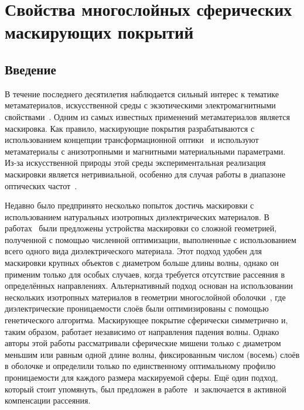 \chapter{ Свойства многослойных сферических маскирующих
  покрытий} \label{chapt3}
\section{Введение}
В течение последнего десятилетия наблюдается сильный интерес к
тематике метаматериалов, искусственной среды с экзотическими
электромагнитными свойствами~\cite{Smith-2004,
  Schurig-2006, Shalaev-2007, Kivshar-2012}. Одним из самых известных
применений метаматериалов является маскировка. Как правило,
маскирующие покрытия разрабатываются с использованием концепции
трансформационной оптики~\cite{pendry_TO, Leonhardt-2006} и
используют метаматериалы с анизотропными и магнитными
материальными параметрами. Из-за искусственной природы этой среды
экспериментальная реализация маскировки является нетривиальной,
особенно для случая работы в диапазоне оптических
частот~\cite{Kildishev:2011, alu, XU-Su:120408, Alu-2005}. 

Недавно было предпринято несколько попыток достичь маскировки с
использованием натуральных изотропных диэлектрических материалов. В
работах~\cite{Sigmund-AllDiel-2011, smith-3dprinterCloak-2013,
  Fujii_topolOpti_theory_2013,
  ma-experiment-topology-2013,LayeredShell,MOP:MOP27024} были
предложены устройства маскировки со сложной геометрией, полученной
с помощью численной оптимизации, выполненные с использованием всего
одного вида диэлектрического материала.  Этот подход удобен для
маскировки крупных объектов с диаметром больше длины волны, однако он
применим только для особых случаев, когда требуется отсутствие рассеяния в
определённых направлениях. Альтернативный подход основан
на использовании нескольких изотропных материалов в геометрии
многослойной оболочки~\cite{Semouchkina-2013}, где
диэлектрические проницаемости слоёв были оптимизированы с помощью
генетического алгоритма. Маскирующее покрытие сферически симметрично
и, таким образом, работает независимо от направления падения
волны. Однако авторы этой работы рассматривали сферические
мишени только с диаметром меньшим или равным одной длине волны,
фиксированным числом (восемь) слоёв в оболочке и определили только по
единственному оптимальному профилю проницаемости для каждого размера маскируемой сферы.
Ещё один подход, который стоит упомянуть, был предложен в
работе~\cite{Elefteriades_ActiveCloak_2013} и заключается в активной
компенсации рассеяния.

